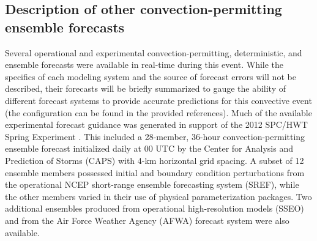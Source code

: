\subsection{Description of other convection-permitting ensemble forecasts}
Several operational and experimental convection-permitting, deterministic, and ensemble forecasts were available in real-time during this event. While the specifics of each modeling system and the source of forecast errors will not be described, their forecasts will be briefly summarized to gauge the ability of different forecast systems to provide accurate predictions for this convective event (the configuration can be found in the provided references). Much of the available experimental forecast guidance was generated in support of the 2012 SPC/HWT Spring Experiment \citep{kainetal12}. This included a 28-member, 36-hour convection-permitting ensemble forecast initialized daily at 00 UTC by the Center for Analysis and Prediction of Storms (CAPS) with 4-km horizontal grid spacing. A subset of 12 ensemble members possessed initial and boundary condition perturbations from the operational NCEP short-range ensemble forecasting system (SREF), while the other members varied in their use of physical parameterization packages. Two additional ensembles produced from operational high-resolution models (SSEO) and from the Air Force Weather Agency (AFWA) forecast system were also available.


